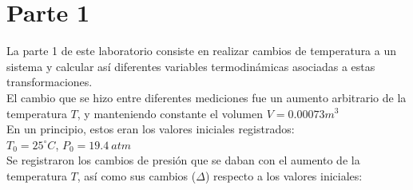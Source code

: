 \documentclass{article}
\begin{document}

% 
% 

\section*{Parte 1}

La parte 1 de este laboratorio consiste en realizar cambios de temperatura a un sistema y calcular así diferentes variables
termodinámicas asociadas a estas transformaciones.\\

El cambio que se hizo entre diferentes mediciones fue un aumento arbitrario de la temperatura $T$, y manteniendo constante el volumen $V = 0.00073 m^3$\\

En un principio, estos eran los valores iniciales registrados:\\

$T_0 = 25 ^\circ{C}$, $P_0 = 19.4\ atm$\\

Se registraron los cambios de presión que se daban con el aumento de la temperatura $T$, así como sus cambios ($\Delta$) respecto a los valores iniciales:
\end{document}
